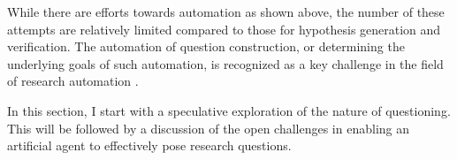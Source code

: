 While there are efforts towards automation as shown above, the number of these attempts are relatively limited compared to those for hypothesis generation and verification. The automation of question construction, or determining the underlying goals of such automation, is recognized as a key challenge in the field of research automation \cite{coley2020autonomousII,zenil2023,kitano2021nobel}. 

In this section, I start with a speculative exploration of the nature of questioning. This will be followed by a discussion of the open challenges in enabling an artificial agent to effectively pose research questions.







